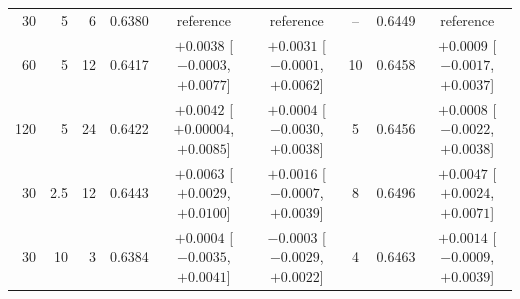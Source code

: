 \begin{table}[t]
\begin{tabular}{@{}rrrcccccc@{}}
30 & 5 & 6 & 0.6380 & reference & reference & -- & 0.6449 & reference \\
60 & 5 & 12 & 0.6417 & $+0.0038$ [$-0.0003$, $+0.0077$] & $+0.0031$ [$-0.0001$, $+0.0062$] & 10 & 0.6458 & $+0.0009$ [$-0.0017$, $+0.0037$] \\
120 & 5 & 24 & 0.6422 & $+0.0042$ [$+0.00004$, $+0.0085$] & $+0.0004$ [$-0.0030$, $+0.0038$] & 5 & 0.6456 & $+0.0008$ [$-0.0022$, $+0.0038$] \\
\midrule
30 & 2.5 & 12 & 0.6443 & $+0.0063$ [$+0.0029$, $+0.0100$] & $+0.0016$ [$-0.0007$, $+0.0039$] & 8 & 0.6496 & $+0.0047$ [$+0.0024$, $+0.0071$] \\
30 & 10 & 3 & 0.6384 & $+0.0004$ [$-0.0035$, $+0.0041$] & $-0.0003$ [$-0.0029$, $+0.0022$] & 4 & 0.6463 & $+0.0014$ [$-0.0009$, $+0.0039$] \\
\bottomrule
\end{tabular}
\end{table}

